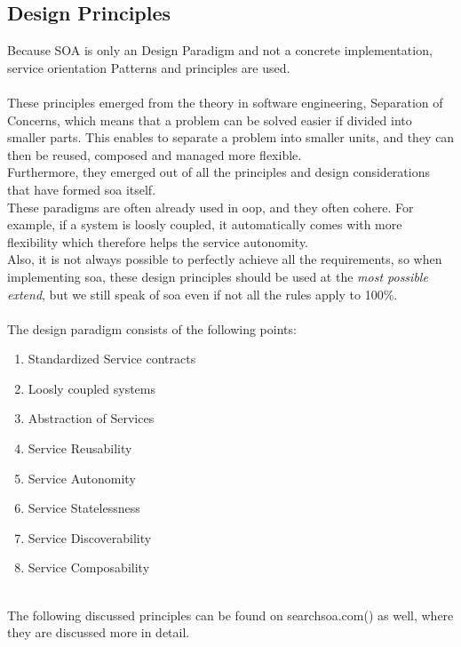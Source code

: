 \documentclass[12pt]{article}
\begin{document}
\subsection{Design Principles}
\label{sec:dp}
Because SOA is only an Design Paradigm and not a concrete implementation, service orientation Patterns and principles are used.\\\\
These principles emerged from the theory in software engineering, Separation of Concerns, which means that a problem can be solved easier if divided into smaller parts. This enables to separate a problem into smaller units, and they can then be reused, composed and managed more flexible.  \cite[page 86]{te}\\ Furthermore, they emerged out of all the principles and design considerations that have formed \gls{soa} itself.
\\
These paradigms are often already used in \gls{oop}, and they often cohere. For example, if a system is loosly coupled, it automatically comes with more flexibility which therefore helps the service autonomity. \\
Also, it is not always possible to perfectly achieve all the requirements, so when implementing \gls{soa}, these design principles should be used at the \textit{most possible extend}, but we still speak of \gls{soa} even if not all the rules apply to 100\%. \\ \\
The design paradigm consists of the following points:
\begin{enumerate}
\item Standardized Service contracts
\item Loosly coupled systems
\item Abstraction of Services
\item Service Reusability
\item Service Autonomity
\item Service Statelessness
\item Service Discoverability
\item Service Composability
\end{enumerate}\cite[page 25]{grau}\\
The following discussed principles can be found on searchsoa.com(\cite{photos}) as well, where they are discussed more in detail.
\end{document}
